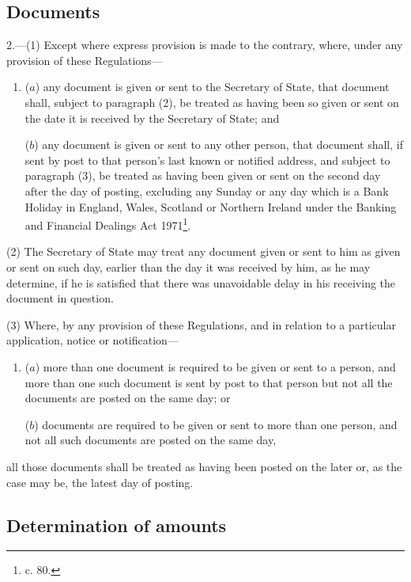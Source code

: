 \documentclass[a4paper]{article}
\begin{document}
\subsection[2. Documents]{Documents}

2.—(1) Except where express provision is made to the contrary, where,
under any provision of these Regulations—
\begin{enumerate}\item[]
($a$) any document is given or sent to the Secretary of State, that document shall,
subject to paragraph (2), be treated as having been so given or sent on the date
it is received by the Secretary of State; and

($b$) any document is given or sent to any other person, that document shall, if
sent by post to that person’s last known or notified address, and subject to
paragraph (3), be treated as having been given or sent on the second day after
the day of posting, excluding any Sunday or any day which is a Bank Holiday in
England, Wales, Scotland or Northern Ireland under the Banking and Financial
Dealings Act 1971\footnote{ c. 80.}.
\end{enumerate}

(2) The Secretary of State may treat any document given or sent to him as given
or sent on such day, earlier than the day it was received by him, as he may
determine, if he is satisfied that there was unavoidable delay in his receiving
the document in question.

(3) Where, by any provision of these Regulations, and in relation to a
particular application, notice or notification—
\begin{enumerate}\item[]
($a$) more than one document is required to be given or sent to a person, and more
than one such document is sent by post to that person but not all the documents
are posted on the same day; or

($b$) documents are required to be given or sent to more than one person, and not
all such documents are posted on the same day,
\end{enumerate}
all those documents shall be treated as having been posted on the later or, as
the case may be, the latest day of posting.

\subsection[3. Determination of amounts]{Determination of amounts}
\end{document}
